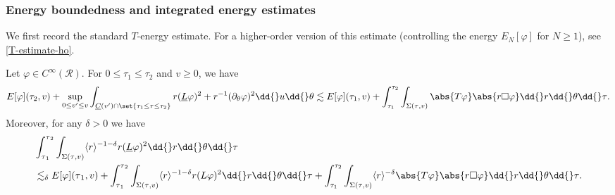 \documentclass[10pt, reqno]{amsart}
\begin{document}
\subsubsection{Energy boundedness and integrated energy estimates}
\label{eb-radially-symmetric}
We first record the standard \(T\)-energy estimate. For a higher-order version
of this estimate (controlling the energy \(E_N[\varphi{}]\) for \(N\ge 1\)), see
\cref{T-estimate-ho}.
\begin{proposition}
Let \(\varphi{}\in C^\infty(\mathcal{R})\). For \(0\le \tau_1\le \tau_2\) and \(v\ge 0\), we have
\begin{equation}\label{energy-boundedness-equation}
E[\varphi{}](\tau_2,v) + \sup_{0\le v'\le v}\int _{\underline{C}(v')\cap \set{\tau_1\le \tau{}\le \tau_2}}r(\underline{L}\varphi{})^2 + r^{-1}(\partial_\theta{}\varphi{})^2\dd{}u\dd{}\theta{} \lesssim E[\varphi{}](\tau_1,v) + \int_{\tau_1}^{\tau_{2}} \int _{\Sigma{}(\tau{},v)}\abs{T\varphi{}}\abs{r\Box{}\varphi{}}\dd{}r\dd{}\theta{}\dd{}\tau{}.
\end{equation}
Moreover, for any \(\delta{} > 0\) we have
\begin{equation}\label{energy-boundedness-with-bulk}
\begin{split}
&\int_{\tau{}_1}^{\tau{}_2} \int _{\Sigma{}(\tau{},v)}\langle{}r\rangle{}^{-1-\delta{}} r(\underline{L}\varphi{})^2\dd{}r\dd{}\theta{}\dd{}\tau{} \\
&\lesssim_\delta{} E[\varphi{}](\tau{}_1,v) +  \int_{\tau{}_1}^{\tau{}_2}  \int _{\Sigma{}(\tau{},v)}\langle{}r\rangle{}^{-1-\delta{}}r(L\varphi{})^2\dd{}r\dd{}\theta{}\dd{}\tau{} + \int_{\tau_1}^{\tau_{2}} \int _{\Sigma{}(\tau{},v)}\langle{}r\rangle^{-\delta{}}\abs{T\varphi{}}\abs{r\Box{}\varphi{}}\dd{}r\dd{}\theta{}\dd{}\tau{}.
\end{split}
\end{equation}
\label{T-estimate}
\end{proposition}
\end{document}
